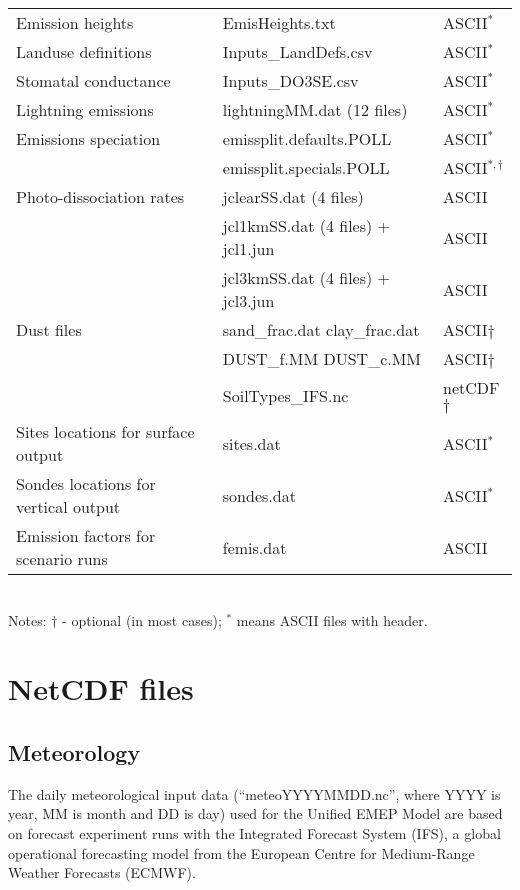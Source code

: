\begin{table}
\begin{center}
\begin{small}
\begin{tabular}{lll}
Emission heights & EmisHeights.txt & ASCII$^*$\\
Landuse definitions & Inputs\_LandDefs.csv & ASCII$^*$\\
Stomatal conductance & Inputs\_DO3SE.csv & ASCII$^*$\\
Lightning emissions & lightningMM.dat  \quad (12 files) & ASCII$^*$\\
Emissions speciation & emissplit.defaults.POLL & ASCII$^*$\\
                     & emissplit.specials.POLL & ASCII$^{*,\dagger}$\\
Photo-dissociation rates & jclearSS.dat \quad (4 files) & ASCII\\
 & jcl1kmSS.dat \quad (4 files) + jcl1.jun & ASCII\\
 & jcl3kmSS.dat \quad (4 files) + jcl3.jun & ASCII\\
Dust files & sand\_frac.dat clay\_frac.dat & ASCII$\dagger$\\
 & DUST\_f.MM DUST\_c.MM & ASCII$\dagger$\\
 & SoilTypes\_IFS.nc & netCDF$\dagger$\\
Sites locations for surface output & sites.dat & ASCII$^*$\\
Sondes locations for vertical output & sondes.dat & ASCII$^*$\\
Emission factors for scenario runs & femis.dat & ASCII\\
\hline
\end{tabular}\\
Notes: $\dagger$ - optional (in most cases); 
$^*$ means ASCII files with header.
\end{small}
\end{center}

\end{table}

\newpage
\section{NetCDF files}



\subsection{Meteorology}

The daily meteorological input data (``meteoYYYYMMDD.nc'', where YYYY is year, MM is month 
and DD is day) used for the Unified EMEP Model are based on
forecast experiment runs with the Integrated Forecast System (IFS), a global
operational forecasting model from the European Centre for Medium-Range
Weather Forecasts (ECMWF).

